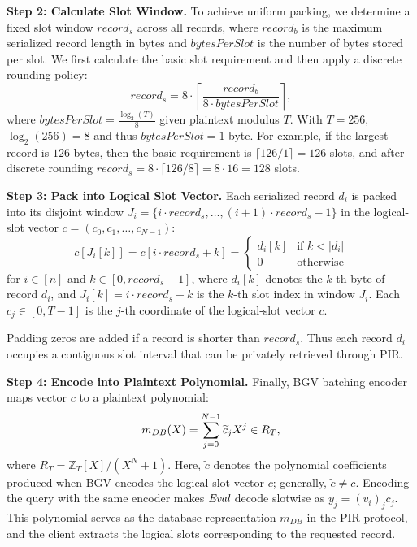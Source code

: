 \documentclass{ieeetj}
\begin{document}
\textbf{Step 2: Calculate Slot Window.}
To achieve uniform packing, we determine a fixed slot window $record_s$ across all records, where $record_b$
is the maximum serialized record length in bytes and $bytesPerSlot$ is the number of bytes stored per slot.
We first calculate the basic slot requirement and then apply a discrete rounding policy:
\begin{equation}
\label{eq:record_s}
record_s = 8 \cdot \left\lceil \frac{record_b}{8 \cdot bytesPerSlot} \right\rceil,
\end{equation}
where $bytesPerSlot = \frac{\log_2(T)}{8}$ given plaintext modulus $T$. With $T=256$, $\log_2(256) = 8$
and thus $bytesPerSlot = 1$ byte. For example, if the largest record is $126$ bytes, then the basic requirement is $\lceil 126 / 1 \rceil = 126$ slots,
and after discrete rounding $record_s = 8 \cdot \lceil 126 / 8 \rceil = 8 \cdot 16 = 128$ slots.

\textbf{Step 3: Pack into Logical Slot Vector.}
Each serialized record $d_i$ is packed into its disjoint window $J_i = \{i \cdot record_s, \dots, (i+1) \cdot record_s - 1\}$ 
in the logical-slot vector $c = (c_0, c_1, \dots, c_{N-1})$:
\begin{equation}
\label{eq:packing}
c[J_i[k]] = c[i \cdot record_s + k] = 
\begin{cases}
d_i[k] & \text{if } k < |d_i| \\
0 & \text{otherwise}
\end{cases}
\end{equation}
for $i \in [n]$ and $k \in [0, record_s-1]$, where $d_i[k]$ denotes the $k$-th byte of record $d_i$,
and $J_i[k] = i \cdot record_s + k$ is the $k$-th slot index in window $J_i$.
Each $c_j \in [0,T-1]$ is the $j$-th coordinate of the logical-slot vector $c$.

Padding zeros are added if a record is shorter than $record_s$. Thus each record $d_i$ occupies a contiguous slot interval that can 
be privately retrieved through PIR.

\textbf{Step 4: Encode into Plaintext Polynomial.}
Finally, BGV batching encoder maps vector $c$ to a plaintext polynomial:
\begin{equation}
\label{eq:polynomial_db}
\emph{$m_{DB}$}(X) = \sum_{j=0}^{N-1}\widetilde{c}_j X^j \in R_T,
\end{equation}
where $R_T = \mathbb{Z}_T[X]/(X^N+1)$. Here, $\widetilde{c}$ denotes the polynomial coefficients produced when BGV encodes
the logical-slot vector $c$; generally, $\widetilde{c}\neq c$. Encoding the query with the same encoder makes $\emph{Eval}$ decode
slotwise as $y_j=(v_i)_j c_j$.
This polynomial serves as the database representation \emph{$m_{DB}$} in the PIR protocol, and the client extracts the logical slots
corresponding to the requested record.
\end{document}
